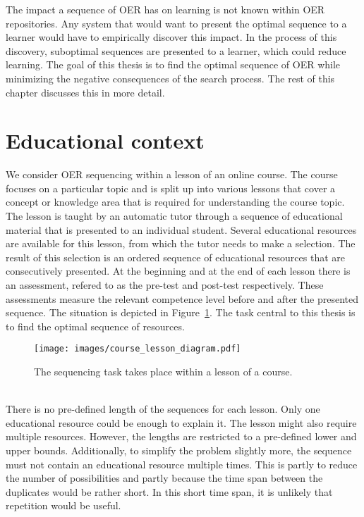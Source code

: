 The impact a sequence of OER has on learning is not known within OER repositories. Any
system that would want to present the optimal sequence to a learner would have
to empirically discover this impact. In the process of this discovery,
suboptimal sequences are presented to a learner, which could reduce learning.
The goal of this thesis is to find the optimal sequence of OER
while minimizing the negative consequences of the search process. The rest of
this chapter discusses this in more detail.
\section{Educational context}
\label{sec:task_context}
We consider OER sequencing within a lesson of an online course. The course
focuses on a particular topic and is split up into various lessons that cover a
concept or knowledge area that is required for understanding the
course topic. The lesson is taught by an automatic tutor through a sequence of
educational material that is presented to an individual student. Several
educational resources are available for this lesson, from which the tutor needs
to make a selection. The result of this selection is an ordered sequence of
educational resources that are consecutively presented. At the beginning and at
the end of each lesson there is an assessment, refered to as the pre-test and
post-test respectively. These assessments measure the relevant competence level
before and after the presented sequence. The situation is depicted in
Figure~\ref{fig:course_lesson_diagram}. The task central to this thesis is to
find the optimal sequence of resources.\\
\begin{figure}[ht]
	\centering
	\texttt{[image: images/course\_lesson\_diagram.pdf]}
	\caption[Educational context of the task]{The sequencing task takes place
	within a lesson of a course.}
	\label{fig:course_lesson_diagram}
\end{figure}\\
\noindent
There is no pre-defined length of the sequences for each lesson. Only one
educational resource could be enough to explain it. The lesson might also
require multiple resources. However, the lengths are restricted to a
pre-defined lower and upper bounds. Additionally, to simplify the problem
slightly more, the sequence must not contain an educational resource multiple
times. This is partly to reduce the number of possibilities and partly because
the time span between the duplicates would be rather short. In this short time
span, it is unlikely that repetition would be useful.
